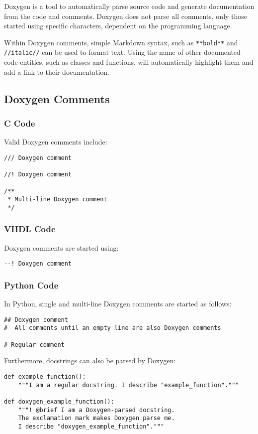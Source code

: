Doxygen is a tool to automatically parse source code and generate documentation from the code and comments.
Doxygen does not parse all comments, only those started using specific characters, dependent on the programming language.

Within Doxygen comments, simple Markdown syntax, such as \texttt{**bold**} and \texttt{//italic//} can be used to format text.
Using the name of other documented code entities, such as classes and functions, will automatically highlight them and add a link to their documentation.


\subsection{Doxygen Comments}

\subsubsection{C Code}

Valid Doxygen comments include:

\begin{lstlisting}[style=CStyle]
/// Doxygen comment

//! Doxygen comment

/**
 * Multi-line Doxygen comment
 */
\end{lstlisting}

\subsubsection{VHDL Code}

Doxygen comments are started using:
\begin{lstlisting}[style=hdl]
--! Doxygen comment
\end{lstlisting}

\subsubsection{Python Code}

In Python, single and multi-line Doxygen comments are started as follows:
\begin{lstlisting}[style=AutomaticsPython]
## Doxygen comment
#  All comments until an empty line are also Doxygen comments

# Regular comment
\end{lstlisting}

Furthermore, docstrings can also be parsed by Doxygen:
\begin{lstlisting}[style=AutomaticsPython]
def example_function():
    """I am a regular docstring. I describe "example_function"."""

def doxygen_example_function():
    """! @brief I am a Doxygen-parsed docstring.
    The exclamation mark makes Doxygen parse me.
    I describe "doxygen_example_function"."""
\end{lstlisting}

